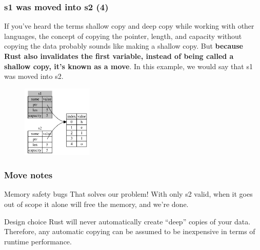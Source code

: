 \documentclass{beamer}
\begin{document}
\begin{frame}[fragile]
	\frametitle{s1 was moved into s2 (4)}
	If you’ve heard the terms shallow copy and deep copy while working with other languages, the concept of copying the pointer, length, and capacity without copying the data probably sounds like making a shallow copy. But \textbf{because Rust also invalidates the first variable, instead of being called a shallow copy, it’s known as a move}. In this example, we would say that s1 was moved into s2. 
	\begin{figure}
		\centering
		\includegraphics[width=0.3\textwidth]{./img/trpl04-04.png}
		\label{fig:figureMove}
	\end{figure}
\end{frame}

\begin{frame}[fragile]
	\frametitle{Move notes}
			
	\begin{block}{Memory safety bugs}
		That solves our problem! With only s2 valid, when it goes out of scope it alone will free the memory, and we’re done.
	\end{block}
	
			
	\begin{block}{Design choice}
		Rust will never automatically create “deep” copies of your data. Therefore, any automatic copying can be assumed to be inexpensive in terms of runtime performance.
	\end{block}
	
\end{frame}
\end{document}
